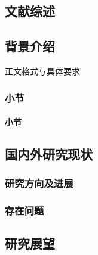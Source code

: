\cleardoublepage
\begin{refsection}
\chapter{文献综述}

\section{背景介绍}
\par 正文格式与具体要求\autocite{zjuthesisrules}

\subsection{小节}

\subsubsection{小节}

\section{国内外研究现状}

\subsection{研究方向及进展}

\subsection{存在问题}

\section{研究展望}

\newpage
\printbibliography
\end{refsection}
